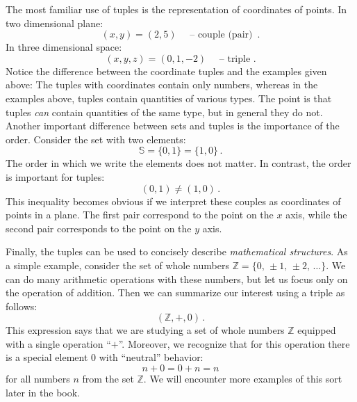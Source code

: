 The most familiar use of tuples is the representation of coordinates
of points. In two dimensional plane:
\[
(x, y) = (2, 5)\quad\textrm{ -- couple (pair) }\,.
\]
In three dimensional space:
\[
(x, y, z) = (0, 1, -2)\quad\textrm{ -- triple }.
\]
Notice the difference between the coordinate tuples and the examples
given above: The tuples with coordinates contain only numbers, whereas
in the examples above, tuples contain quantities of various types. The
point is that tuples \emph{can} contain quantities of the same type,
but in general they do not. Another important difference between sets
and tuples is the importance of the order. Consider the set with two
elements:
\[
\mathbb{S} = \lbrace 0, 1\rbrace = \lbrace 1, 0\rbrace\,.
\]
The order in which we write the elements does not matter. In contrast,
the order is important for tuples:
\[
(0, 1) \ne (1, 0)\,.
\]
This inequality becomes obvious if we interpret these couples as
coordinates of points in a plane. The first pair correspond to the
point on the $x$ axis, while the second pair corresponds to the point
on the $y$ axis.

Finally, the tuples can be used to concisely describe
\emph{mathematical structures}. As a
simple example, consider the set
of whole numbers $\mathbb{Z}=\lbrace 0,\, \pm 1,\, \pm 2,\,\ldots \rbrace$.
  We can do many arithmetic operations with these numbers, but let us
focus only on the operation of addition. Then we can summarize our
interest using a triple as follows:
\[
(\mathbb{Z}, +, 0)\,.
\]
This expression says that we are studying a set of whole numbers $\mathbb{Z}$
equipped with a single operation ``$+$''. Moreover, we recognize that for
this operation there is a special element $0$ with ``neutral''
behavior:
\[
n + 0 = 0 + n = n
\]
for all numbers $n$ from the set $\mathbb{Z}$. We will encounter more
examples of this sort later in the book.

\vspace{1cm}
